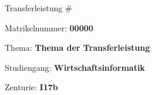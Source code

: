 \documentclass[../main.tex]{subfiles}
\begin{document}
\begin{titlepage}
\centering
{\Huge Transferleistung \# \par}
\vspace{1.5cm}
{\LARGE Matrikelnummer: \textbf{00000}\par}
\vspace{1cm}
{\LARGE Thema: \textbf{Thema der Transferleistung}\par}
\vspace{1cm}
{\LARGE Studiengang: \textbf{Wirtschaftsinformatik}\par}
\vspace{1cm}
{\LARGE Zenturie: \textbf{I17b}\par}
\end{titlepage}
\end{document}
